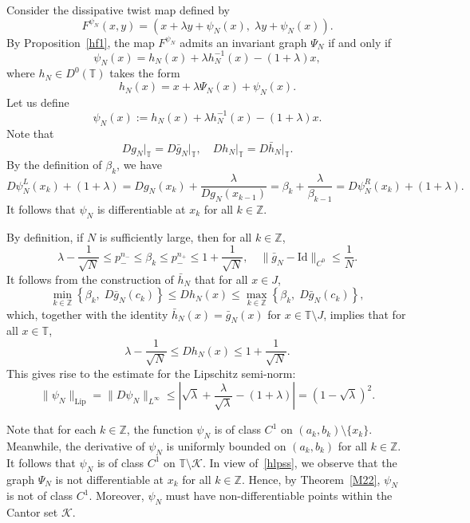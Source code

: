 \documentclass{amsart}
\newcommand{\T}{\mathbb{T}}
\theoremstyle{definition}
\begin{document}
Consider the dissipative twist map defined by
\[
F^{\psi_N}(x,y) = \left(x + \lambda y + \psi_N(x),\; \lambda y + \psi_N(x)\right).
\]
By Proposition~\ref{hf1}, the map $F^{\psi_N}$ admits an invariant graph $\Psi_N$ if and only if
\[
\psi_N(x) = h_N(x) + \lambda h_N^{-1}(x) - (1 + \lambda)x,
\]
where $h_N \in D^0(\T)$ takes the form
\begin{equation}\label{hlpss}
h_N(x) = x + \lambda \Psi_N(x) + \psi_N(x).
\end{equation}
Let us define
\[
\psi_N(x) := h_N(x) + \lambda h_N^{-1}(x) - (1 + \lambda)x.
\]
Note that
\[
Dg_N\big|_{\T} = D\bar{g}_N\big|_{\T}, \quad Dh_N\big|_{\T} = D\bar{h}_N\big|_{\T}.
\]
By the definition of $\beta_k$, we have
\[
D\psi^L_N(x_k) + (1 + \lambda) = Dg_N(x_k) + \frac{\lambda}{Dg_N(x_{k-1})} = \beta_k + \frac{\lambda}{\beta_{k-1}} = D\psi^R_N(x_k) + (1 + \lambda).
\]
It follows that $\psi_N$ is differentiable at $x_k$ for all $k \in \mathbb{Z}$.

By definition, if $N$ is sufficiently large, then for all $k \in \mathbb{Z}$,
\[
\lambda - \frac{1}{\sqrt{N}} \leq p^{n_-}_- \leq \beta_k \leq p^{n_+}_- \leq 1 + \frac{1}{\sqrt{N}}, \quad \|\bar{g}_N - \mathrm{Id}\|_{C^0} \leq \frac{1}{N}.
\]
It follows from the construction of $\bar{h}_N$ that for all $x \in J$,
\[
\min_{k \in \mathbb{Z}} \left\{ \beta_k,\; D\bar{g}_N(c_k) \right\} \leq Dh_N(x) \leq \max_{k \in \mathbb{Z}} \left\{ \beta_k,\; D\bar{g}_N(c_k) \right\},
\]
which, together with the identity $\bar{h}_N(x) = \bar{g}_N(x)$ for $x \in \T \setminus J$, implies that for all $x \in \T$,
\[
\lambda - \frac{1}{\sqrt{N}} \leq Dh_N(x) \leq 1 + \frac{1}{\sqrt{N}}.
\]
This gives rise to the estimate for the Lipschitz semi-norm:
\begin{equation}\label{lipsem}
\|\psi_N\|_{\mathrm{Lip}} = \|D\psi_N\|_{L^\infty} \leq \left| \sqrt{\lambda} + \frac{\lambda}{\sqrt{\lambda}} - (1 + \lambda) \right| = (1 - \sqrt{\lambda})^2.
\end{equation}

Note that for each $k \in \mathbb{Z}$, the function $\psi_N$ is of class $C^1$ on $(a_k, b_k) \setminus \{x_k\}$. Meanwhile, the derivative of $\psi_N$ is uniformly bounded on $(a_k, b_k)$ for all $k \in \mathbb{Z}$. It follows that $\psi_N$ is of class $C^1$ on $\T \setminus \mathcal{K}$. In view of~\eqref{hlpss}, we observe that the graph $\Psi_N$ is not differentiable at $x_k$ for all $k \in \mathbb{Z}$. Hence, by Theorem~\ref{M22}, $\psi_N$ is not of class $C^1$. Moreover, $\psi_N$ must have non-differentiable points within the Cantor set $\mathcal{K}$.
\end{document}
